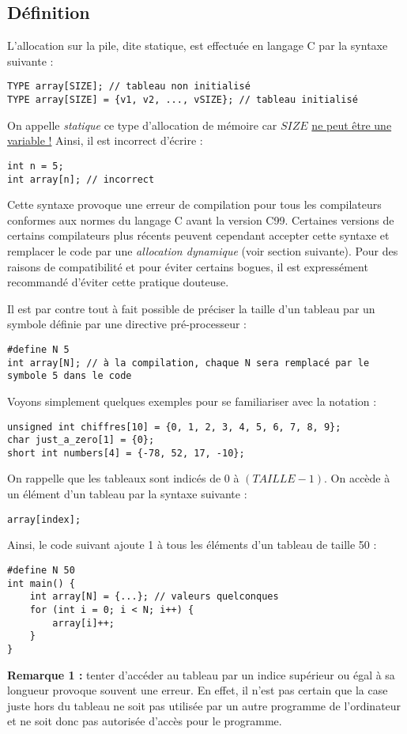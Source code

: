 \documentclass[../../../main.tex]{subfiles}
\begin{document}
\subsection{Définition}
L'allocation sur la pile, dite statique, est effectuée en langage C par la syntaxe suivante :
\begin{verbatim}
TYPE array[SIZE]; // tableau non initialisé
TYPE array[SIZE] = {v1, v2, ..., vSIZE}; // tableau initialisé
\end{verbatim}
On appelle \textit{statique} ce type d'allocation de mémoire car $SIZE$ \underline{ne peut être une variable !} Ainsi, il est incorrect d'écrire :
\begin{verbatim}
int n = 5;
int array[n]; // incorrect
\end{verbatim}
Cette syntaxe provoque une erreur de compilation pour tous les compilateurs conformes aux normes du langage C avant la version C99. Certaines versions de certains compilateurs plus récents peuvent cependant accepter cette syntaxe et remplacer le code par une \textit{allocation dynamique} (voir section suivante). Pour des raisons de compatibilité et pour éviter certains bogues, il est expressément recommandé d'éviter cette pratique douteuse.
 
Il est par contre tout à fait possible de préciser la taille d'un tableau par un symbole définie par une directive pré-processeur :
\begin{verbatim}
#define N 5
int array[N]; // à la compilation, chaque N sera remplacé par le symbole 5 dans le code
\end{verbatim}
Voyons simplement quelques exemples pour se familiariser avec la notation :
\begin{verbatim}
unsigned int chiffres[10] = {0, 1, 2, 3, 4, 5, 6, 7, 8, 9};
char just_a_zero[1] = {0};
short int numbers[4] = {-78, 52, 17, -10};
\end{verbatim}
On rappelle que les tableaux sont indicés de 0 à $(TAILLE - 1)$. On accède à un élément d'un tableau par la syntaxe suivante :
\begin{verbatim}
array[index];
\end{verbatim}
Ainsi, le code suivant ajoute 1 à tous les éléments d'un tableau de taille 50 :
\begin{verbatim}
#define N 50
int main() {
	int array[N] = {...}; // valeurs quelconques
	for (int i = 0; i < N; i++) {
		array[i]++;
	}
}
\end{verbatim}
\textbf{Remarque 1 :} tenter d'accéder au tableau par un indice supérieur ou égal à sa longueur provoque souvent une erreur. En effet, il n'est pas certain que la case juste hors du tableau ne soit pas utilisée par un autre programme de l'ordinateur et ne soit donc pas autorisée d'accès pour le programme.
 
\end{document}

